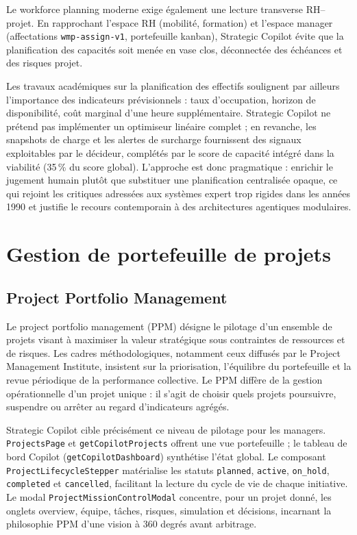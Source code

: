 Le workforce planning moderne exige également une lecture transverse RH--projet. En rapprochant l'espace RH (mobilité, formation) et l'espace manager (affectations \texttt{wmp-assign-v1}, portefeuille kanban), Strategic Copilot évite que la planification des capacités soit menée en vase clos, déconnectée des échéances et des risques projet.

Les travaux académiques sur la planification des effectifs soulignent par ailleurs l'importance des indicateurs prévisionnels : taux d'occupation, horizon de disponibilité, coût marginal d'une heure supplémentaire. Strategic Copilot ne prétend pas implémenter un optimiseur linéaire complet ; en revanche, les snapshots de charge et les alertes de surcharge fournissent des signaux exploitables par le décideur, complétés par le score de capacité intégré dans la viabilité (35\,\% du score global). L'approche est donc pragmatique : enrichir le jugement humain plutôt que substituer une planification centralisée opaque, ce qui rejoint les critiques adressées aux systèmes expert trop rigides dans les années 1990 et justifie le recours contemporain à des architectures agentiques modulaires.

\section{Gestion de portefeuille de projets}

\subsection{Project Portfolio Management}

Le project portfolio management (PPM) \cite{pmi2021,cooper2016} désigne le pilotage d'un ensemble de projets visant à maximiser la valeur stratégique sous contraintes de ressources et de risques. Les cadres méthodologiques, notamment ceux diffusés par le Project Management Institute, insistent sur la priorisation, l'équilibre du portefeuille et la revue périodique de la performance collective. Le PPM diffère de la gestion opérationnelle d'un projet unique : il s'agit de choisir quels projets poursuivre, suspendre ou arrêter au regard d'indicateurs agrégés.

Strategic Copilot cible précisément ce niveau de pilotage pour les managers. \texttt{ProjectsPage} et \texttt{getCopilotProjects} offrent une vue portefeuille ; le tableau de bord Copilot (\texttt{getCopilotDashboard}) synthétise l'état global. Le composant \texttt{ProjectLifecycleStepper} matérialise les statuts \texttt{planned}, \texttt{active}, \texttt{on\_hold}, \texttt{completed} et \texttt{cancelled}, facilitant la lecture du cycle de vie de chaque initiative. Le modal \texttt{ProjectMissionControlModal} concentre, pour un projet donné, les onglets overview, équipe, tâches, risques, simulation et décisions, incarnant la philosophie PPM d'une vision à 360 degrés avant arbitrage.

